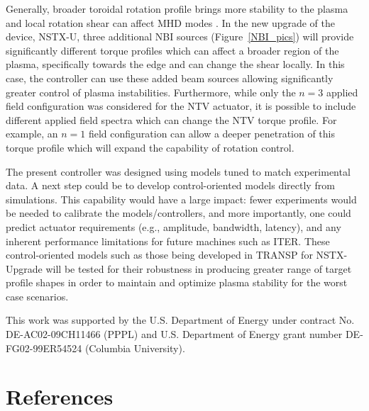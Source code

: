 \documentclass[12pt]{iopart}
\begin{document}
Generally, broader toroidal rotation profile brings more stability to the plasma \cite{Sabbagh10} and local rotation shear can affect MHD modes  \cite{Gerhardt09}. In the new upgrade of the device, NSTX-U, three additional NBI sources (Figure~{\ref{NBI_pics}}) will provide significantly different torque profiles which can affect a broader region of the plasma, specifically towards the edge and can change the shear locally. In this case, the controller can use these added beam sources allowing significantly greater control of plasma instabilities.
Furthermore, while only the $n = 3$ applied field configuration was considered for the NTV actuator, it is possible to include different applied field spectra which can change the NTV torque profile. For example, an $n=1$ field configuration can allow a deeper penetration of this torque profile which will expand the capability of rotation control.

The present controller was designed using models tuned to match experimental data. A next step could be to develop control-oriented models directly from simulations. This capability would have a large impact: fewer experiments would be needed to calibrate the models/controllers, and more importantly, one could predict actuator requirements (e.g., amplitude, bandwidth, latency), and any inherent performance limitations for future machines such as ITER.
These control-oriented models such as those being developed in TRANSP for NSTX-Upgrade will be tested for their robustness in producing greater range of target profile shapes in order to maintain and optimize plasma stability for the worst case scenarios. 

 
\ack 

This work was supported by the U.S. Department of Energy under contract No. DE-AC02-09CH11466 (PPPL) and U.S. Department of Energy  grant number DE-FG02-99ER54524 (Columbia University). 
\section*{References}



\end{document}
